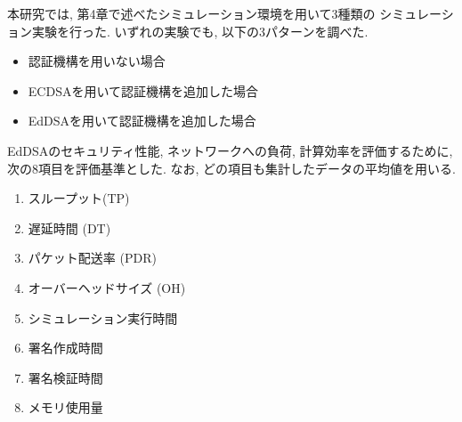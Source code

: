本研究では, 第4章で述べたシミュレーション環境を用いて3種類の
シミュレーション実験を行った. いずれの実験でも, 以下の3パターンを調べた. 
\begin{itemize}
  \item 認証機構を用いない場合
  \item ECDSAを用いて認証機構を追加した場合
  \item EdDSAを用いて認証機構を追加した場合
\end{itemize}

EdDSAのセキュリティ性能, ネットワークへの負荷, 計算効率を評価するために, 
次の8項目を評価基準とした. なお, どの項目も集計したデータの平均値を用いる.  
\vspace{-3mm}

\begin{enumerate}
    \item スループット(TP)
    \item 遅延時間 (DT) 
    \item パケット配送率 (PDR)
    \item オーバーヘッドサイズ (OH)
    \item シミュレーション実行時間
    \item 署名作成時間
    \item 署名検証時間
    \item メモリ使用量
\end{enumerate}
